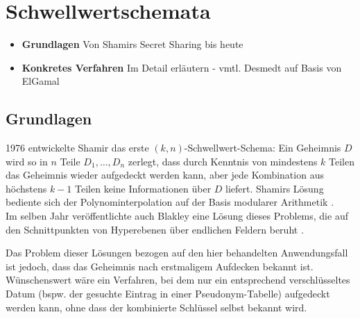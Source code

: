 \chapter{Schwellwertschemata}

\begin{itemize}
  \item \textbf{Grundlagen} Von Shamirs Secret Sharing bis heute
  \item \textbf{Konkretes Verfahren} Im Detail erläutern - vmtl. Desmedt auf Basis von ElGamal
\end{itemize}





\label{cha_threshold}

\section{Grundlagen}






1976 entwickelte Shamir das erste \((k,n)\)-Schwellwert-Schema: Ein Geheimnis \(D\) wird so in \(n\) Teile \(D_1, \dots, D_n\) zerlegt, dass durch Kenntnis von mindestens \(k\) Teilen das Geheimnis wieder aufgedeckt werden kann, aber jede Kombination aus höchstens \(k-1\) Teilen keine Informationen über \(D\) liefert. Shamirs Lösung bediente sich der Polynominterpolation auf der Basis modularer Arithmetik \cite{shamir1979}.\\
Im selben Jahr veröffentlichte auch Blakley eine Lösung dieses Problems, die auf den Schnittpunkten von Hyperebenen über endlichen Feldern beruht \cite{blakley1979}.

Das Problem dieser Lösungen bezogen auf den hier behandelten Anwendungsfall ist jedoch, dass das Geheimnis nach erstmaligem Aufdecken bekannt ist. Wünschenswert wäre ein Verfahren, bei dem nur ein entsprechend verschlüsseltes Datum (bspw. der gesuchte Eintrag in einer Pseudonym-Tabelle) aufgedeckt werden kann, ohne dass der kombinierte Schlüssel selbst bekannt wird. 


